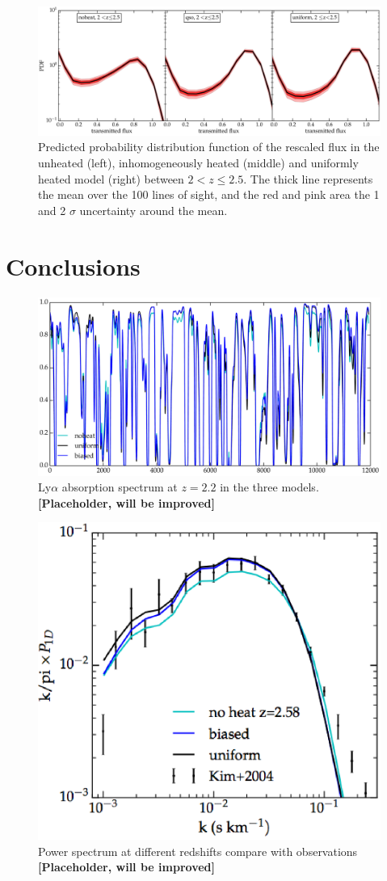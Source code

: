 \documentclass[numberedappendix]{emulateapj}
\newcommand\ALc[1]{{\color{red} \bf #1}} %
\begin{document}
\begin{figure}[h]
\centering
\includegraphics[width = .9\textwidth ]{PDF_predict_allz_100lines}
\caption{Predicted probability distribution function of the rescaled flux in the unheated (left), inhomogeneously heated (middle) and uniformly heated model (right) between $2 <z\leq 2.5$. The thick line represents the mean over the 100 lines of sight, and the red and pink area the 1 and 2 $\sigma$ uncertainty around the mean.  }
\label{fig:PDF_predict}
\end{figure}


\section{Conclusions}\label{sec:conclusion}

\begin{figure}[h]
\centering
\includegraphics[width = .8\textwidth ]{lines_z2_2}
\caption{Ly$\alpha$ absorption spectrum at $z=2.2$ in the three models. \ALc{[Placeholder, will be improved]}}
\label{fig:bias}
\end{figure}

\begin{figure}[h]
\centering
\includegraphics[width = .45\textwidth ]{powerspec}
\caption{ Power spectrum at different redshifts compare with observations \ALc{[Placeholder, will be improved]}}
\label{fig:powespec}
\end{figure}
\end{document}
